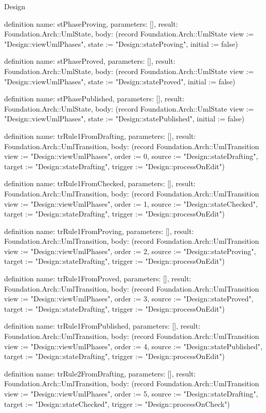 \begin{lexlean}{Design}
\begin{semanticmodule}
definition{
  name: stPhaseProving,
  parameters: [],
  result: Foundation.Arch::UmlState,
  body: (record Foundation.Arch::UmlState {view := "Design::viewUmlPhases", state := "Design::stateProving", initial := false})
}

definition{
  name: stPhaseProved,
  parameters: [],
  result: Foundation.Arch::UmlState,
  body: (record Foundation.Arch::UmlState {view := "Design::viewUmlPhases", state := "Design::stateProved", initial := false})
}

definition{
  name: stPhasePublished,
  parameters: [],
  result: Foundation.Arch::UmlState,
  body: (record Foundation.Arch::UmlState {view := "Design::viewUmlPhases", state := "Design::statePublished", initial := false})
}

definition{
  name: trRule1FromDrafting,
  parameters: [],
  result: Foundation.Arch::UmlTransition,
  body: (record Foundation.Arch::UmlTransition {view := "Design::viewUmlPhases", order := 0, source := "Design::stateDrafting", target := "Design::stateDrafting", trigger := "Design::processOnEdit"})
}

definition{
  name: trRule1FromChecked,
  parameters: [],
  result: Foundation.Arch::UmlTransition,
  body: (record Foundation.Arch::UmlTransition {view := "Design::viewUmlPhases", order := 1, source := "Design::stateChecked", target := "Design::stateDrafting", trigger := "Design::processOnEdit"})
}

definition{
  name: trRule1FromProving,
  parameters: [],
  result: Foundation.Arch::UmlTransition,
  body: (record Foundation.Arch::UmlTransition {view := "Design::viewUmlPhases", order := 2, source := "Design::stateProving", target := "Design::stateDrafting", trigger := "Design::processOnEdit"})
}

definition{
  name: trRule1FromProved,
  parameters: [],
  result: Foundation.Arch::UmlTransition,
  body: (record Foundation.Arch::UmlTransition {view := "Design::viewUmlPhases", order := 3, source := "Design::stateProved", target := "Design::stateDrafting", trigger := "Design::processOnEdit"})
}

definition{
  name: trRule1FromPublished,
  parameters: [],
  result: Foundation.Arch::UmlTransition,
  body: (record Foundation.Arch::UmlTransition {view := "Design::viewUmlPhases", order := 4, source := "Design::statePublished", target := "Design::stateDrafting", trigger := "Design::processOnEdit"})
}

definition{
  name: trRule2FromDrafting,
  parameters: [],
  result: Foundation.Arch::UmlTransition,
  body: (record Foundation.Arch::UmlTransition {view := "Design::viewUmlPhases", order := 5, source := "Design::stateDrafting", target := "Design::stateChecked", trigger := "Design::processOnCheck"})
}


\end{semanticmodule}
\end{lexlean}
